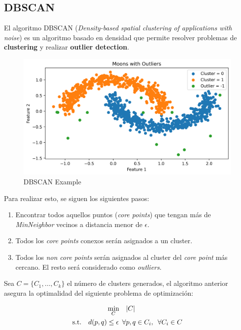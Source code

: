 \subsection{DBSCAN}

El algoritmo DBSCAN (\textit{Density-based spatial clustering of applications with noise}) es un algoritmo basado en densidad que permite resolver problemas de \textbf{clustering} y realizar \textbf{outlier detection}. 

\begin{figure}[H]
    \center
    \includegraphics[scale=0.5]{notebooks/ML/img/dbscan_on_moons.png}
    \caption{DBSCAN Example}
\end{figure}

Para realizar esto, se siguen los siguientes pasos: 

\begin{enumerate}
    \item Encontrar todos aquellos puntos (\textit{core points}) que tengan más de \textit{MinNeighbor} vecinos a distancia menor de $\epsilon$. 
    \item Todos los \textit{core points} conexos serán asignados a un cluster. 
    \item Todos los \textit{non core points} serán asignados al cluster del \textit{core point} más cercano. El resto será considerado como \textit{outliers}. 
\end{enumerate}

Sea $C = \{ C_1 , \dots , C_{k} \}$ el número de clusters generados, el algoritmo anterior asegura la optimalidad del siguiente problema de optimización: 

\begin{equation*}
\begin{aligned}
\min_{C} \quad &|C| \\
\textrm{s.t.} \quad d(p,q) \leq \epsilon \hspace{0.5em} \forall &p,q \in C_i, \hspace{0.5em} \forall C_i \in C
\end{aligned}
\end{equation*}

